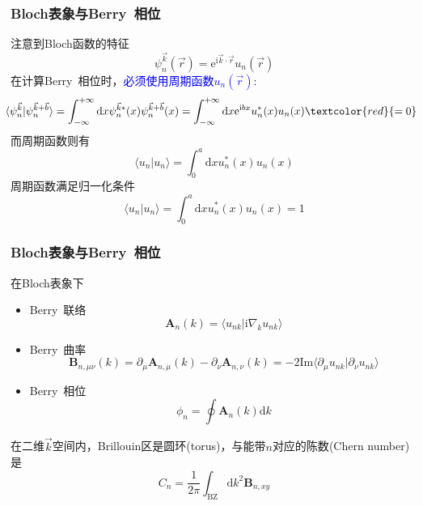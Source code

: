 \frame
{
	\frametitle{\rm{Bloch}表象与\rm{Berry~}相位}
	注意到\textrm{Bloch}函数的特征
	\begin{displaymath}
		\psi_n^{\vec k}(\vec r)=\mathrm{e}^{\mathrm{i}\vec k\cdot\vec r}u_n(\vec r)
	\end{displaymath}
	在计算\textrm{Berry~}相位时，\textcolor{blue}{必须使用周期函数$u_n(\vec r)$}:
	\begin{displaymath}
		\hspace*{-5pt}
		\langle\psi_n^{\vec k}|\psi_n^{\vec k+\vec b}\rangle=\int_{-\infty}^{+\infty}\mathrm{d}x\psi_n^{\vec k\ast}(x)\psi_n^{\vec k+\vec b}(x)=\int_{-\infty}^{+\infty}\mathrm{d}x\mathrm{e}^{\mathrm{i}bx} u_n^{\ast}(x)u_n(x)\textcolor{red}{=0}
	\end{displaymath}
而周期函数则有
	\begin{displaymath}
		\langle u_n|u_n\rangle=\int_0^a\mathrm{d}x u_n^{\ast}(x)u_n(x)
	\end{displaymath}
周期函数满足归一化条件
	\begin{displaymath}
		\langle u_n|u_n\rangle=\int_0^a\mathrm{d}x u_n^{\ast}(x)u_n(x)=1
	\end{displaymath}
}

\frame
{
	\frametitle{\rm{Bloch}表象与\rm{Berry~}相位}
	在\textrm{Bloch}表象下
	\begin{itemize}
		\item \textrm{Berry~}联络	
	\begin{displaymath}
		\mathbf{A}_n(k)=\langle u_{nk}|\mathrm{i}\nabla_{k}u_{nk}\rangle
	\end{displaymath}
\item \textrm{Berry~}曲率
	\begin{displaymath}
		\mathbf{B}_{n,\mu\nu}(k)=\partial_{\mu}\mathbf{A}_{n,\mu}(k)-\partial_{\nu}\mathbf{A}_{n,\nu}(k)=-2\mathrm{Im}\langle\partial_{\mu}u_{nk}|\partial_{\nu}u_{nk}\rangle
	\end{displaymath}
\item \textrm{Berry~}相位
	\begin{displaymath}
		\phi_n=\oint\mathbf{A}_n(k)\mathrm{d}k
	\end{displaymath}
	\end{itemize}
	在二维$\vec k$空间内，\textrm{Brillouin}区是圆环\textrm{(torus)}，与能带$n$对应的陈数\textrm{(Chern number)}是
	\begin{displaymath}
		C_n=\dfrac1{2\pi}\int_{\mathrm{BZ}}\mathrm{d}k^2\mathbf{B}_{n,xy}
	\end{displaymath}
}

